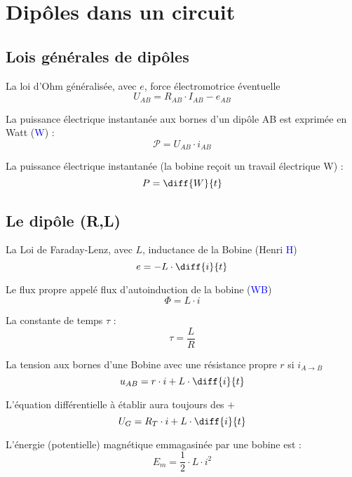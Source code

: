 \documentclass[../MAIN/main.tex]{subfiles}
\begin{document}
\section{Dipôles dans un circuit}

\subsection{Lois générales de dipôles}
\begin{Definition}
La loi d'Ohm généralisée, avec $e$, force électromotrice éventuelle
$$U_{AB} = R_{AB} \cdot I_{AB} - e_{AB}$$

La puissance électrique instantanée aux bornes d'un dipôle AB est exprimée en Watt (\textcolor{blue}{W}) :
$$\mathcal{P} = U_{AB} \cdot i_{AB} $$

La puissance électrique instantanée (la bobine reçoit un travail électrique W) :
$$P = \diff{W}{t}$$

\end{Definition}

\subsection{Le dipôle (R,L)}
\begin{Definition}
La Loi de Faraday-Lenz, avec $L$, inductance de la Bobine (Henri \textcolor{blue}{H})
$$e = - L \cdot \diff{i}{t}$$

Le flux propre appelé flux d'autoinduction de la bobine (\textcolor{blue}{WB})
$$\Phi = L \cdot i$$

La constante de temps $\tau$ : 
$$\tau = \dfrac{L}{R} $$

La tension aux bornes d'une Bobine avec une résistance propre $r$ si $i_{A\rightarrow B}$
$$u_{AB} = r \cdot i + L \cdot \diff{i}{t}$$

L'équation différentielle à établir aura toujours des $+$
$$U_{G} = R_{T} \cdot i + L \cdot \diff{i}{t}$$

L'énergie (potentielle) magnétique emmagasinée par une bobine est :
$$E_{m} = \dfrac{1}{2} \cdot L \cdot i^2$$
\end{Definition}
\end{document}
